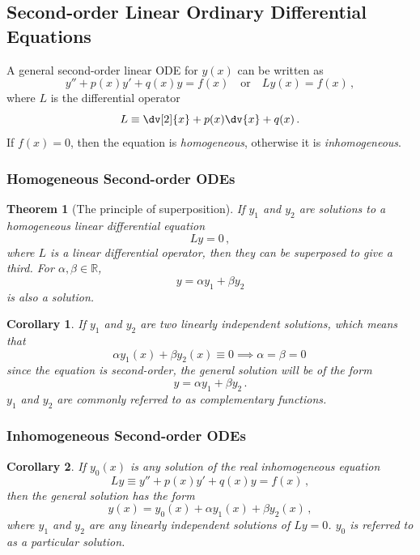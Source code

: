 \documentclass{article}
\theoremstyle{plain}\theoremheaderfont{\normalfont\itshape}\theorembodyfont{\rmfamily}\theoremseparator{.}\newtheorem*{rem}{Remark}\newtheorem*{ex}{Example}\newtheorem*{proof}{Proof}\newtheorem*{altp}{Alternative proof}
\theoremstyle{plain}\theoremheaderfont{\normalfont\bfseries}\theorembodyfont{\rmfamily}\theoremseparator{.}\newtheorem{thm}{Theorem}[section]\newtheorem{lem}[thm]{Lemma}\newtheorem{prop}[thm]{Proposition}\newtheorem*{cor}{Corollary}\newtheorem{defn}[thm]{Definition}\newtheorem{clm}[thm]{Claim}\newtheorem{clminproof}{Claim}
\theoremstyle{break}\theoremheaderfont{\normalfont\itshape}\theorembodyfont{\rmfamily}\theoremseparator{.\medskip}\newtheorem*{proofskip}{Proof}\newtheorem*{exs}{Examples}\newtheorem*{rems}{Remarks}
\theoremstyle{break}\theoremheaderfont{\normalfont\bfseries}\theorembodyfont{\rmfamily}\theoremseparator{.\medskip}\newtheorem{lemskip}[thm]{Lemma}\newtheorem{defnskip}[thm]{Definition}\newtheorem{propskip}[thm]{Proposition}\newtheorem{thmskip}[thm]{Theorem}
\numberwithin{equation}{section}
\begin{document}
	\subsection{Second-order Linear Ordinary Differential Equations}
	A general second-order linear ODE for \(y(x)\) can be written as
	\[y''+p(x)y'+q(x)y=f(x)\quad \text{or}\quad Ly(x)=f(x)\,,\]
	where \(L\) is the differential operator
	\[L\equiv\dv[2]{x}+p(x)\dv{x}+q(x)\,.\]
	If \(f(x)=0\), then the equation is \textit{homogeneous}, otherwise it is \textit{inhomogeneous}.

	\subsubsection{Homogeneous Second-order ODEs}

	\begin{thm}[The principle of superposition]
		If \(y_1\) and \(y_2\) are solutions to a homogeneous linear differential equation
		\[Ly=0\,,\]
		where \(L\) is a linear differential operator, then they can be superposed to give a third. For \(\alpha,\beta\in\mathbb{R}\),
		\[y=\alpha y_1+\beta y_2\]
		is also a solution.
	\end{thm}
	
	\begin{cor}
		If \(y_1\) and \(y_2\) are two linearly independent solutions, which means that
		\[\alpha y_1(x)+\beta y_2(x)\equiv 0\implies\alpha=\beta=0\,\]
		since the equation is second-order, the general solution will be of the form
		\[y=\alpha y_1+\beta y_2\,.\]
		\(y_1\) and \(y_2\) are commonly referred to as \textit{complementary functions}.
	\end{cor}
	\subsubsection{Inhomogeneous Second-order ODEs}
	\begin{cor}
		If \(y_0(x)\) is any solution of the real inhomogeneous equation
		\[Ly\equiv y''+p(x)y'+q(x)y=f(x)\,,\]
		then the general solution has the form
		\[y(x)=y_0(x)+\alpha y_1(x)+\beta y_2(x)\,,\]
		where \(y_1\) and \(y_2\) are any linearly independent solutions of \(Ly=0\). \(y_0\) is referred to as a \textit{particular solution}.
	\end{cor}
\end{document}
